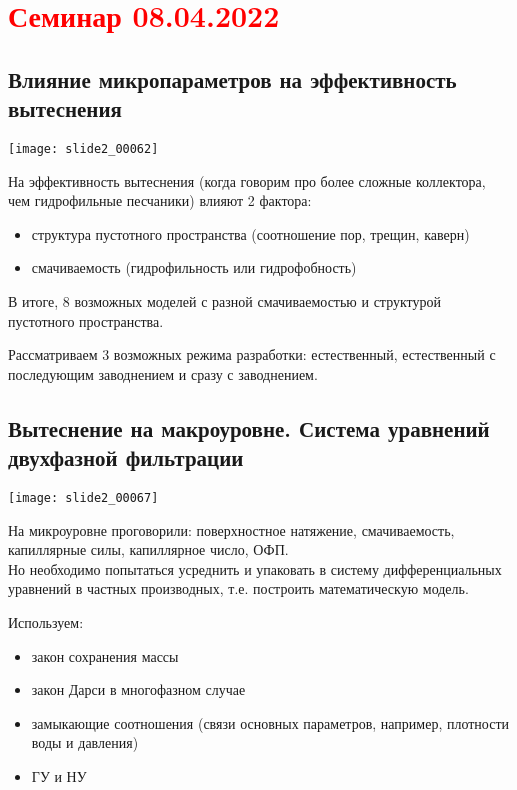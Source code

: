 \documentclass[main.tex]{subfiles}
\begin{document}
\section{\textcolor{red}{Семинар 08.04.2022}}

\subsection{Влияние микропараметров на эффективность вытеснения}

\texttt{[image: slide2\_00062]}

На эффективность вытеснения (когда говорим про более сложные коллектора, чем гидрофильные песчаники) влияют 2 фактора:
\begin{itemize}
	\item структура пустотного пространства (соотношение пор, трещин, каверн)
	\item смачиваемость (гидрофильность или гидрофобность)
\end{itemize}
В итоге, 8 возможных моделей с разной смачиваемостью и структурой пустотного пространства.


Рассматриваем 3 возможных режима разработки: естественный, естественный с последующим заводнением и сразу с заводнением.


\subsection{Вытеснение на макроуровне. Система уравнений двухфазной фильтрации}

\texttt{[image: slide2\_00067]}

На микроуровне проговорили: поверхностное натяжение, смачиваемость, капиллярные силы, капиллярное число, ОФП.\\

Но необходимо попытаться усреднить и упаковать в систему дифференциальных уравнений в частных производных, т.е. построить математическую модель.


Используем:
\begin{itemize}
	\item закон сохранения массы
	\item закон Дарси в многофазном случае
	\item замыкающие соотношения (связи основных параметров, например, плотности воды и давления)
	\item ГУ и НУ
\end{itemize}
\end{document}
